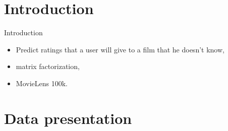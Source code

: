 \documentclass[unknownkeysallowed]{beamer}
\begin{document}


\section{Introduction}
\label{sec:introdcution}

\begin{frame}{Introduction}
\begin{itemize}
    \item Predict ratings that a user will give to a film that he doesn't know, 
    \item matrix factorization, 
    \item MovieLens 100k.
\end{itemize}
\end{frame}

\section{Data presentation}
\label{sec:data}
\end{document}
